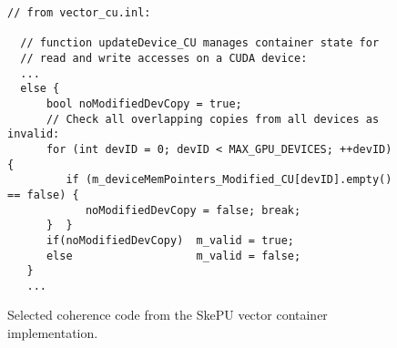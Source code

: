 \begin{figure}
\begin{small}
\begin{verbatim}
// from vector_cu.inl:

  // function updateDevice_CU manages container state for
  // read and write accesses on a CUDA device:
  ...
  else {
      bool noModifiedDevCopy = true;
      // Check all overlapping copies from all devices as invalid:
      for (int devID = 0; devID < MAX_GPU_DEVICES; ++devID) {
         if (m_deviceMemPointers_Modified_CU[devID].empty() == false) {
            noModifiedDevCopy = false; break;
      }  }
      if(noModifiedDevCopy)  m_valid = true;
      else                   m_valid = false;
   }
   ...
\end{verbatim}
\end{small}

\vspace*{-3mm}
\caption{\label{fig:skepucoherence2}Selected coherence code from the SkePU vector container implementation.}
\end{figure}
  
